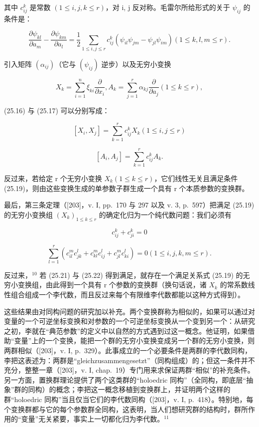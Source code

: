 其中 \(c_{ij}^{k}\) 是常数 \((1 \leq i, j, k \leq r)\)，对 i, j 反对称。毛雷尔所给形式的关于 \(\psi_{ij}\) 的条件是：

\[
\frac {\partial \psi_ {k l}}{\partial a _ {m}} - \frac {\partial \psi_ {k m}}{\partial a _ {l}} = \frac {1}{2} \sum_ {1 \leq i, j \leq r} c _ {i j} ^ {k} (\psi_ {i l} \psi_ {j m} - \psi_ {j l} \psi_ {i m}) (1 \leq k, l, m \leq r).\tag{25.17}
\]

引入矩阵 \((\alpha_{ij})\)（它与 \((\psi_{ij})\) 逆步）以及无穷小变换

\[
X _ {k} = \sum_ {i = 1} ^ {n} \xi_ {k i} \frac {\partial}{\partial x _ {i}}, A _ {k} = \sum_ {j = 1} ^ {r} \alpha_ {k j} \frac {\partial}{\partial a _ {j}} (1 \leq k \leq r),\tag{25.18}
\]

(25.16) 与 (25.17) 可以分别写成：

\[
[ X _ {i}, X _ {j} ] = \sum_ {k = 1} ^ {r} c _ {i j} ^ {k} X _ {k} (1 \leq i, j \leq r)\tag{25.19}
\]

\[
\left[ A _ {i}, A _ {j} \right] = \sum_ {k = 1} ^ {r} c _ {i j} ^ {k} A _ {k}.\tag{25.20}
\]

反过来，若给定 r 个无穷小变换 \(X_{k}(1 \leq k \leq r)\)，它们线性无关且满足条件 (25.19)，则由这些变换生成的单参数子群生成一个具有 r 个本质参数的变换群。

最后，第三条定理（{[}203{]}，v. I, pp.~170 与 297 以及 v. 3, p.~597）把满足 (25.19) 的无穷小变换组 \((X_{k})_{1\leq k\leq r}\) 的确定化归为一个纯代数问题：我们必须有

\[
c _ {i j} ^ {k} + c _ {j i} ^ {k} = 0\tag{25.21}
\]

\[
\sum_ {l = 1} ^ {r} (c _ {i l} ^ {m} c _ {j k} ^ {l} + c _ {k l} ^ {m} c _ {i j} ^ {l} + c _ {j l} ^ {m} c _ {k i} ^ {l}) = 0 (1 \leq i, j, k, m \leq r).\tag{25.22}
\]

反过来，\(^{10}\) 若 (25.21) 与 (25.22) 得到满足，就存在一个满足关系式 (25.19) 的无穷小变换组，由此得到一个具有 r 个参数的变换群（换句话说，诸 \(X_{k}\) 的常系数线性组合组成一个李代数，而且反过来每个有限维李代数都能以这种方式得到）。

这些结果由对同构问题的研究加以补充。两个变换群称为相似的，如果可以通过对变量的一个可逆坐标变换和对参数的一个可逆坐标变换从一个变到另一个：从研究之初，李就在“典范参数”的定义中以自然的方式遇到过这一概念。他证明，如果借助“变量”上的一个变换，能把一个群的无穷小变换变成另一个群的无穷小变换，则两群相似（{[}203{]}，v. I, p.~329）。此事成立的一个必要条件是两群的李代数同构，李把这表述为：两群是“gleichzusammengesetzt”（同构组成）的；但这一条件并不充分，整整一章（{[}203{]}，v. I, chap.~19）专门用来求保证两群“相似”的补充条件。另一方面，置换群理论提供了两个这类群的“holoedric 同构”（全同构，即底层“抽象”群的同构）的概念；李把这一概念移植到变换群上，并证明两个这样的群“holoedric 同构”当且仅当它们的李代数同构（{[}203{]}，v. I, p.~418）。特别地，每个变换群都与它的每个参数群全同构，这表明，当人们想研究群的结构时，群所作用的“变量”无关紧要，事实上一切都化归为李代数。\(^{11}\)

